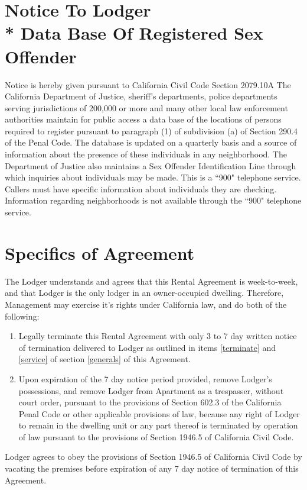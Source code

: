 \documentclass[12pt,letterpaper]{article}
\newcommand{\notice}{Notice To Lodger\\* Data Base Of Registered Sex Offender} %
\newcommand{\specifics}{Specifics of Agreement}			%
\newcommand{\management}{Management}
\newcommand{\apt}{Apartment}
\newcommand{\lodger}{Lodger}
\begin{document}
\newpage
\section{\notice{}} \label{notice}

Notice is hereby given pursuant to California Civil Code Section 2079.10A The California Department of Justice, sheriff's departments, police departments serving jurisdictions of 200,000 or more and many other local law enforcement authorities maintain for public access a data base of the locations of persons required to register pursuant to paragraph (1) of subdivision (a) of Section 290.4 of the Penal Code. The database is updated on a quarterly basis and a source of information about the presence of these individuals in any neighborhood. The Department of Justice also maintains a Sex Offender Identification Line through which inquiries about individuals may be made. This is a ``900" telephone service. Callers must have specific information about individuals they are checking. Information regarding neighborhoods is not available through the ``900" telephone service. 

\newpage
\section{\specifics{}} \label{specifics}

The \lodger{} understands and agrees that this Rental Agreement is week-to-week, and that \lodger{} is the only lodger in an owner-occupied dwelling. Therefore, \management{} may exercise it's rights under California law, and do both of the following: 
\begin{enumerate}
	\item Legally terminate this Rental Agreement with only 3 to 7 day written notice of termination delivered to \lodger{} as outlined in items \ref{terminate} and \ref{service} of section \ref{generals} of this Agreement.
	\item Upon expiration of the 7 day notice period provided, remove \lodger{}'s possessions, and remove \lodger{} from \apt{} as a trespasser, without court order, pursuant to the provisions of Section 602.3 of the California Penal Code or other applicable provisions of law, because any right of \lodger{} to remain in the dwelling unit or any part thereof is terminated by operation of law pursuant to the provisions of Section 1946.5 of California Civil Code.
\end{enumerate}

\lodger{} agrees to obey the provisions of Section 1946.5 of California Civil Code by vacating the premises before expiration of any 7 day notice of termination of this Agreement.
\end{document}
